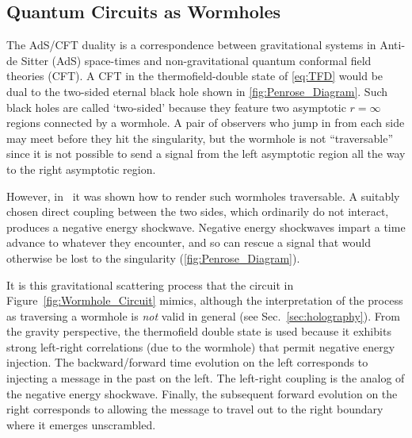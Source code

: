 \documentclass[aps,pra,reprint,floatfix,superscriptaddress, nofootinbib,longbibliography,onecolumn,notitlepage,12pt, tightenlines]{revtex4-1}
\begin{document}
\subsection{Quantum Circuits as Wormholes}
The AdS/CFT duality is a correspondence between gravitational systems in Anti-de Sitter (AdS) space-times and non-gravitational quantum conformal field theories (CFT). A CFT in the thermofield-double state of \cref{eq:TFD} would be dual to the two-sided eternal black hole shown in \cref{fig:Penrose_Diagram}. Such black holes are called `two-sided' because they feature two asymptotic $r=\infty$ regions connected by a wormhole. A pair of observers who jump in from each side may meet before they hit the singularity, but the wormhole is not ``traversable'' since it is not possible to send a signal from the left asymptotic region all the way to the right asymptotic region.

However, in~\cite{gao2017traversable} it was shown how to render such wormholes traversable. A suitably chosen direct coupling between the two sides, which ordinarily do not interact, produces a negative energy shockwave. Negative energy shockwaves impart a time advance to whatever they encounter, and so can rescue  a signal that would otherwise be lost to the singularity (\cref{fig:Penrose_Diagram}).

It is this gravitational scattering process that the circuit in Figure~\ref{fig:Wormhole_Circuit} mimics, although the interpretation of the process as traversing a wormhole is \emph{not} valid in general (see Sec.~\ref{sec:holography}). From the gravity perspective, the thermofield double state is used because it exhibits strong left-right correlations (due to the wormhole) that permit negative energy injection. The backward/forward time evolution on the left corresponds to injecting a message in the past on the left. The left-right coupling is the analog of the negative energy shockwave. Finally, the subsequent forward evolution on the right corresponds to allowing the message to travel out to the right boundary where it emerges unscrambled.
\end{document}
